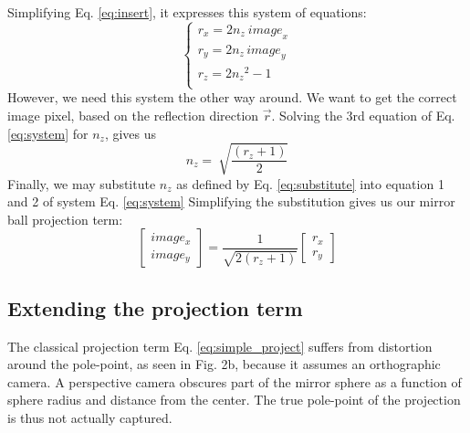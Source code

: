 \documentclass[10pt]{article}
\begin{document}
\begin{multicols}{2}
\begin{equation}
\end{equation}
Simplifying Eq. \ref{eq:insert}, it expresses this system of equations:
\begin{equation}\label{eq:system}
	\left\{\begin{matrix}r_x=2n_z\ {image}_x\\r_y=2n_{z\ }{image}_y\\r_z=2{n_z}^2-1\ \ \ \ \ \\\end{matrix}\right.
\end{equation}
However, we need this system the other way around. We want to get the correct image pixel, based on the reflection direction $\vec{r}$. Solving the 3rd equation of Eq. \ref{eq:system} for $n_z$, gives us
\begin{equation}\label{eq:substitute}
	n_z=\ \sqrt{\frac{\left(r_z+1\right)}{2}}
\end{equation}	
Finally, we may substitute $n_z$ as defined by Eq. \ref{eq:substitute} into equation 1 and 2 of system Eq. \ref{eq:system} Simplifying the substitution gives us our mirror ball projection term:
\begin{equation}\label{eq:simple_project}
	\begin{bmatrix} image_x \\ image_y \end{bmatrix}=\frac{1}{\sqrt{2(r_z+1)}}\begin{bmatrix} r_x \\ r_y \end{bmatrix}
\end{equation}

\subsection{Extending the projection term}
The classical projection term Eq. \ref{eq:simple_project} suffers from distortion around the pole-point, as seen in Fig. 2b, because it assumes an orthographic camera. A perspective camera obscures part of the mirror sphere as a function of sphere radius and distance from the center. The true pole-point of the projection is thus not actually captured. 


\end{multicols}
\end{document}
